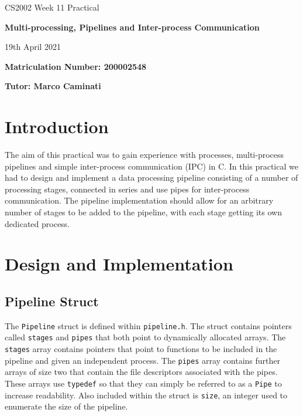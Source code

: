 \documentclass{article}
\begin{document}
    \nocite{*}

    \begin{center}
        \Huge
        CS2002 Week 11 Practical

        \vspace{0.5cm}

        \textbf{Multi-processing, Pipelines and Inter-process Communication}

        \vspace{1cm}
        \LARGE
        19th April 2021

        \large
        \vspace{1.5cm}

        \textbf{Matriculation Number: 200002548}

        \vspace{0.5cm}

        \textbf{Tutor: Marco Caminati}

    \end{center}

    \vspace*{2.9cm}

    \tableofcontents

    \newpage
    \section{Introduction}
    The aim of this practical was to gain experience with processes, multi-process pipelines and simple inter-process communication (IPC)
    in C. In this practical we had to design and implement a data processing pipeline consisting of a number of processing stages, connected in series
    and use pipes for inter-process communication.
    The pipeline implementation should allow for an arbitrary number of stages to be added to the pipeline, with each stage getting its own dedicated process.

    \section{Design and Implementation}
    \subsection{Pipeline Struct}
    The \verb+Pipeline+ struct is defined within \verb+pipeline.h+.
    The struct contains pointers called \verb+stages+ and \verb+pipes+ that both point to dynamically allocated arrays.
    The \verb+stages+ array contains pointers that point to functions to be included in the pipeline and given an independent process.
    The \verb+pipes+ array contains further arrays of size two that contain the file descriptors associated with the pipes.
    These arrays use \verb+typedef+ so that they can simply be referred to as a \verb+Pipe+ to increase readability.
    Also included within the struct is \verb+size+, an integer used to enumerate the size of the pipeline.
\end{document}
